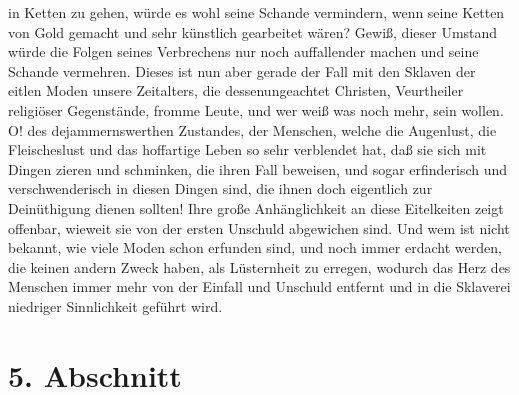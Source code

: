 in Ketten zu gehen, würde es wohl seine Schande vermindern, wenn seine Ketten
von Gold gemacht und sehr künstlich gearbeitet wären? Gewiß, dieser Umstand
würde die Folgen seines Verbrechens nur noch auffallender machen und seine
Schande vermehren. Dieses ist nun aber gerade der Fall mit den Sklaven der
eitlen Moden unsere Zeitalters, die dessenungeachtet Christen, Veurtheiler
religiöser Gegenstände, fromme Leute, und wer weiß was noch mehr, sein wollen.
O! des dejammernswerthen Zustandes, der Menschen, welche die Augenlust, die
Fleischeslust und das hoffartige Leben so sehr verblendet hat, daß sie sich mit
Dingen zieren und schminken, die ihren Fall beweisen, und sogar erfinderisch und
verschwenderisch in diesen Dingen sind, die ihnen doch eigentlich zur
Deinüthigung dienen sollten! Ihre große Anhänglichkeit an diese Eitelkeiten
zeigt offenbar, wieweit sie von der ersten Unschuld abgewichen sind. Und wem ist
nicht bekannt, wie viele Moden schon erfunden sind, und noch immer erdacht
werden, die keinen andern Zweck haben, als Lüsternheit zu erregen, wodurch das
Herz des Menschen immer mehr von der Einfall und Unschuld entfernt und in die
Sklaverei niedriger Sinnlichkeit geführt wird.

\section{5. Abschnitt} \label{kap14_ab5}

